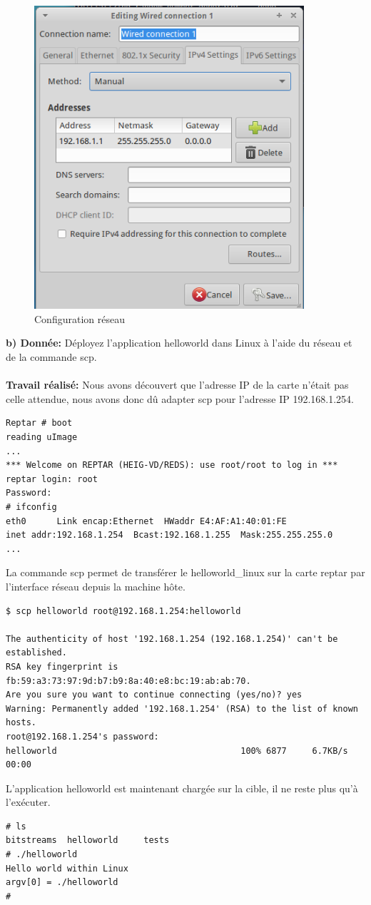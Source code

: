 \begin{figure}[H]
	\begin{center}
		\includegraphics[width=10cm]{img/ipConfig.png}
		\caption{Configuration réseau}
		\label{ipConfig}
	\end{center}
\end{figure}
\textbf{b) Donnée: }Déployez l'application helloworld dans Linux à l'aide du réseau et de la commande scp.\\\\
\textbf{Travail réalisé: } Nous avons découvert que l'adresse IP de la carte n'était pas celle attendue, nous avons donc dû adapter scp pour l'adresse IP 192.168.1.254.
\begin{lstlisting}
Reptar # boot
reading uImage
...
*** Welcome on REPTAR (HEIG-VD/REDS): use root/root to log in ***
reptar login: root
Password: 
# ifconfig
eth0      Link encap:Ethernet  HWaddr E4:AF:A1:40:01:FE  
inet addr:192.168.1.254  Bcast:192.168.1.255  Mask:255.255.255.0
...
\end{lstlisting}
La commande scp permet de transférer le helloworld\_linux sur la carte reptar par l'interface réseau depuis la machine hôte.
\begin{lstlisting}
$ scp helloworld root@192.168.1.254:helloworld

The authenticity of host '192.168.1.254 (192.168.1.254)' can't be established.
RSA key fingerprint is fb:59:a3:73:97:9d:b7:b9:8a:40:e8:bc:19:ab:ab:70.
Are you sure you want to continue connecting (yes/no)? yes
Warning: Permanently added '192.168.1.254' (RSA) to the list of known hosts.
root@192.168.1.254's password: 
helloworld                                    100% 6877     6.7KB/s   00:00    
\end{lstlisting}
L'application helloworld est maintenant chargée sur la cible, il ne reste plus qu'à l'exécuter.
\begin{lstlisting}
# ls
bitstreams  helloworld     tests
# ./helloworld 
Hello world within Linux
argv[0] = ./helloworld
#
\end{lstlisting}
